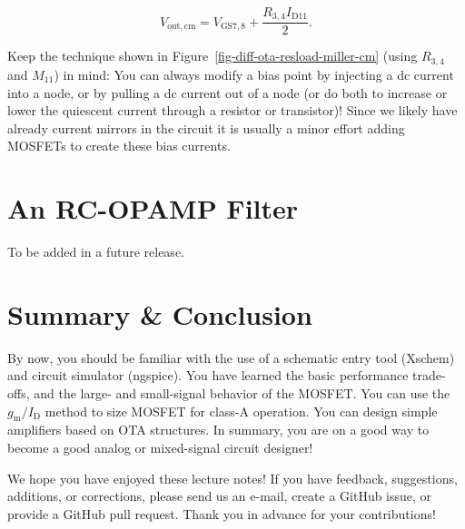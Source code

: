\documentclass[
  a4paper,
  DIV=11,
  numbers=noendperiod]{scrartcl}
\begin{document}
\[
V_\mathrm{out,cm} = V_\mathrm{GS7,8} + \frac{R_{3,4} I_\mathrm{D11}}{2}.
\]

\begin{tcolorbox}[enhanced jigsaw, colframe=quarto-callout-warning-color-frame, breakable, title=\textcolor{quarto-callout-warning-color}{\faExclamationTriangle}\hspace{0.5em}{Modify Bias Points with Currents}, titlerule=0mm, coltitle=black, arc=.35mm, colback=white, opacitybacktitle=0.6, leftrule=.75mm, toptitle=1mm, left=2mm, bottomrule=.15mm, bottomtitle=1mm, rightrule=.15mm, opacityback=0, toprule=.15mm, colbacktitle=quarto-callout-warning-color!10!white]

Keep the technique shown in Figure~\ref{fig-diff-ota-resload-miller-cm}
(using \(R_{3,4}\) and \(M_{11}\)) in mind: You can always modify a bias
point by injecting a dc current into a node, or by pulling a dc current
out of a node (or do both to increase or lower the quiescent current
through a resistor or transistor)! Since we likely have already current
mirrors in the circuit it is usually a minor effort adding MOSFETs to
create these bias currents.

\end{tcolorbox}

\section{An RC-OPAMP Filter}\label{an-rc-opamp-filter}

To be added in a future release.

\section{Summary \& Conclusion}\label{summary-conclusion}

By now, you should be familiar with the use of a schematic entry tool
(Xschem) and circuit simulator (ngspice). You have learned the basic
performance trade-offs, and the large- and small-signal behavior of the
MOSFET. You can use the \(g_\mathrm{m}/I_\mathrm{D}\) method to size
MOSFET for class-A operation. You can design simple amplifiers based on
OTA structures. In summary, you are on a good way to become a good
analog or mixed-signal circuit designer!

\begin{tcolorbox}[enhanced jigsaw, colframe=quarto-callout-important-color-frame, breakable, title=\textcolor{quarto-callout-important-color}{\faExclamation}\hspace{0.5em}{Feedback}, titlerule=0mm, coltitle=black, arc=.35mm, colback=white, opacitybacktitle=0.6, leftrule=.75mm, toptitle=1mm, left=2mm, bottomrule=.15mm, bottomtitle=1mm, rightrule=.15mm, opacityback=0, toprule=.15mm, colbacktitle=quarto-callout-important-color!10!white]

We hope you have enjoyed these lecture notes! If you have feedback,
suggestions, additions, or corrections, please send us an e-mail, create
a GitHub issue, or provide a GitHub pull request. Thank you in advance
for your contributions!

\end{tcolorbox}
\end{document}
